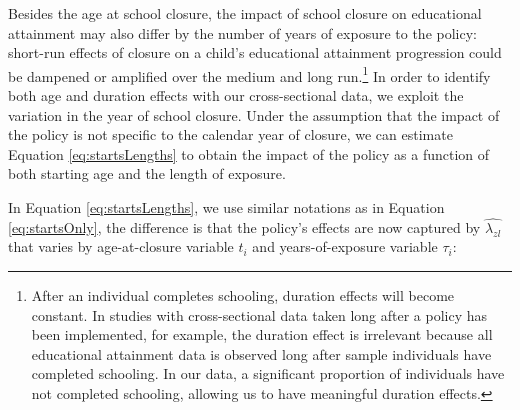 \label{subsec:estione}

Besides the age at school closure, the impact of school closure on educational attainment may also differ by the number of years of exposure to the policy: short-run effects of closure on a child's educational attainment progression could be dampened or amplified over the medium and long run.\footnote{After an individual completes schooling, duration effects will become constant. In studies with cross-sectional data taken long after a policy has been implemented, \textcite{duflo_school_2001} for example, the duration effect is irrelevant because all educational attainment data is observed long after sample individuals have completed schooling. In our data, a significant proportion of individuals have not completed schooling, allowing us to have meaningful duration effects.}  In order to identify both age and duration effects with our cross-sectional data, we exploit the variation in the year of school closure. Under the assumption that the impact of the policy is not specific to the calendar year of closure, we can estimate Equation \ref{eq:startsLengths} to obtain the impact of the policy as a function of both starting age and the length of exposure.

In Equation \ref{eq:startsLengths}, we use similar notations as in Equation \ref{eq:startsOnly}, the difference is that the policy's effects are now captured by $\hat{\lambda_{zl}}$ that varies by age-at-closure variable \(t_{i}\) and years-of-exposure variable $\tau_{i}$:

